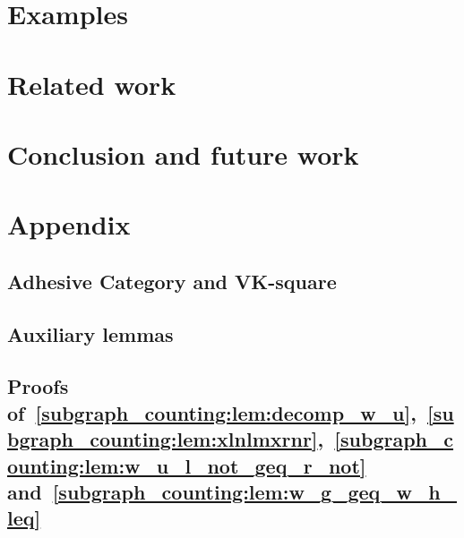 \documentclass{report}
\begin{document}
\section{Examples} 
\label{subgraph_counting:sec:examples}


  
\section{Related work}
\label{subgraph_counting:sec:related_work} 


\section{Conclusion and future work}
\label{subgraph_counting:sec:conclusion} 


\section{Appendix}
\subsection*{Adhesive Category and VK-square}

\subsection*{Auxiliary lemmas}

\subsection*{Proofs of~\autoref{subgraph_counting:lem:decomp_w_u},~\autoref{subgraph_counting:lem:xlnlmxrnr},~\autoref{subgraph_counting:lem:w_u_l_not_geq_r_not} and~\autoref{subgraph_counting:lem:w_g_geq_w_h_leq}}
\label{subgraph_counting:sec:appendix:a}




%  
\end{document}
